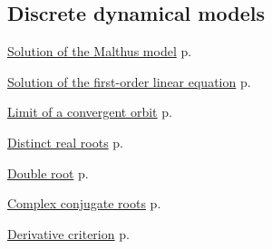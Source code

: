 \documentclass[11pt,a4paper]{article}
\theoremstyle{definition} \newtheorem{definition}{Definition} \theoremstyle{plain} \newtheorem{theorem}{Theorem}
\begin{document}
\subsection*{Discrete dynamical models}
\begin{description}
\item \hyperref[thm:malthus]{Solution of the Malthus model} \dotfill p.~\pageref{thm:malthus}
\item \hyperref[thm:first-order-linear]{Solution of the first-order linear equation} \dotfill p.~\pageref{thm:first-order-linear}
\item \hyperref[thm:limit-orbit]{Limit of a convergent orbit} \dotfill p.~\pageref{thm:limit-orbit}
\item \hyperref[thm:distinct-real-roots]{Distinct real roots} \dotfill p.~\pageref{thm:distinct-real-roots}
\item \hyperref[thm:double-root]{Double root} \dotfill p.~\pageref{thm:double-root}
\item \hyperref[thm:complex-roots]{Complex conjugate roots} \dotfill p.~\pageref{thm:complex-roots}
\item \hyperref[thm:derivative-criterion]{Derivative criterion} \dotfill p.~\pageref{thm:derivative-criterion}
\end{description}
\end{document}
